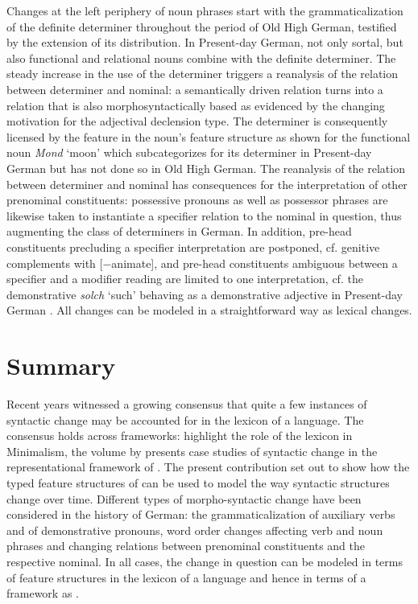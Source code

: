 \documentclass[output=paper
                ,modfonts
                ,nonflat
	        ,collection
	        ,collectionchapter
	        ,collectiontoclongg
 	        ,biblatex
                ,babelshorthands
                ,newtxmath
                ,draftmode
                ,colorlinks, citecolor=brown
]{./langsci/langscibook}
\begin{document}
Changes at the left periphery of noun phrases start with the grammaticalization of the definite determiner throughout the period of Old High German, testified by the extension of its distribution. In Present-day German, not only sortal, but also functional and relational nouns combine with the definite determiner. The steady increase in the use of the determiner triggers a reanalysis of the relation between determiner and nominal: a semantically driven relation turns into a relation that is also morphosyntactically based as evidenced by the changing motivation for the adjectival declension type. The determiner is consequently licensed by the \cat feature in the noun's feature structure as shown for the functional noun \textit{Mond} `moon' which subcategorizes for its determiner in Present-day German but has not done so in Old High German.
\ea \label{noun}
\z 
The reanalysis of the relation between determiner and nominal has consequences for the interpretation of other prenominal constituents: possessive pronouns as well as possessor phrases are likewise taken to instantiate a specifier relation to the nominal in question, thus augmenting the class of determiners in German. In addition, pre-head constituents precluding a specifier interpretation are postponed, cf. genitive complements with [$-$animate], and pre-head constituents ambiguous between a specifier and a modifier reading are limited to one interpretation, cf. the demonstrative \textit{solch} `such' behaving as a demonstrative adjective in Present-day German \citep{demske2005}. All changes can be modeled in a straightforward way as lexical changes.  

\section{Summary} 

Recent years witnessed a growing consensus that quite a few  instances of syntactic change may be accounted for in the lexicon of a language. The consensus holds across frameworks: \cite{BiWa2015} highlight the role of the lexicon in Minimalism, the volume by \cite{BuKi2001} presents case studies of syntactic change in the representational framework of \lfg. The present contribution set out to show how the typed feature structures of \hpsg can be used to model the way syntactic structures change over time. Different types of morpho-syntactic change have been considered in the history of German: the grammaticalization of auxiliary verbs and of demonstrative pronouns, word order changes affecting verb and noun phrases and changing relations between prenominal constituents and the respective nominal. In all cases, the change in question can be modeled in terms of feature structures in the lexicon of a language and hence in terms of a framework as \hpsg.  
\end{document}
